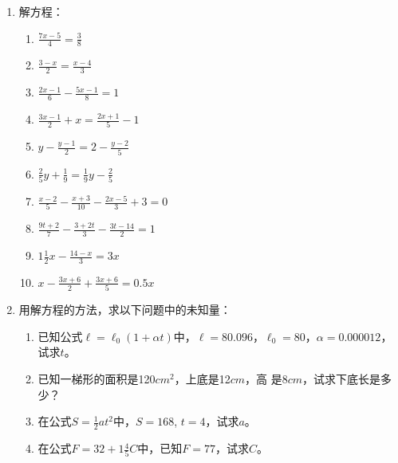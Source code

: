 \begin{enumerate}
\item 解方程：
\begin{multicols}{2}
\begin{enumerate}
\item $\frac{7x-5}{4}=\frac{3}{8}$
\item $\frac{3-x}{2}=\frac{x-4}{3}$
\item $\frac{2x-1}{6}-\frac{5x-1}{8}=1$
\item $\frac{3x-1}{2}+x=\frac{2x+1}{5}-1$
\item $y-\frac{y-1}{2}=2-\frac{y-2}{5}$
\item $\frac{2}{5}y+\frac{1}{9}=\frac{1}{9}y-\frac{2}{5}$
\item $\frac{x-2}{5}-\frac{x+3}{10}-\frac{2x-5}{3}+3=0$
\item $\frac{9t+2}{7}-\frac{3+2t}{3}-\frac{3t-14}{2}=1$
\item $1\frac{1}{2}x-\frac{14-x}{3}=3x$
\item $x-\frac{3x+6}{2}+\frac{3x+6}{5}=0.5x$    
\end{enumerate}
\end{multicols}
\item 用解方程的方法，求以下问题中的未知量：
\begin{enumerate}
    \item 已知公式$\ell=\ell_0(1+\alpha t)$中，$\ell= 80.096$，$\ell_0 = 80$，$\alpha=0.000012$，试求$t$。
\item 已知一梯形的面积是120$cm^2$，上底是12$cm$，高
是8$cm$，试求下底长是多少？
\item 在公式$S=\frac{1}{2}at^2$中，$S=168$, $t=4$，试求$a$。
\item 在公式$F=32+1\frac{4}{5}C$中，已知$F=77$，试求$C$。
\end{enumerate}


\end{enumerate}
